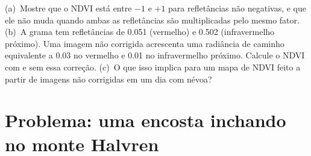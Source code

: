 \begin{exercise}[$\star\star\star$]\label{exo:b3:remote-sensing-gis:12}
(a)~Mostre que o NDVI está entre $-1$ e $+1$ para refletâncias não negativas, e que ele
não muda quando ambas as refletâncias são
multiplicadas pelo mesmo fator. (b)~A grama tem refletâncias de 0.051 (vermelho)
e 0.502 (infravermelho próximo). Uma imagem não corrigida acrescenta uma radiância de caminho
equivalente a 0.03 no vermelho e 0.01 no infravermelho próximo. Calcule o
NDVI com e sem essa correção. (c)~O que isso implica para um mapa de NDVI
feito a partir de imagens não corrigidas em um dia com névoa?
\end{exercise}

\section{Problema: uma encosta inchando no monte Halvren}

